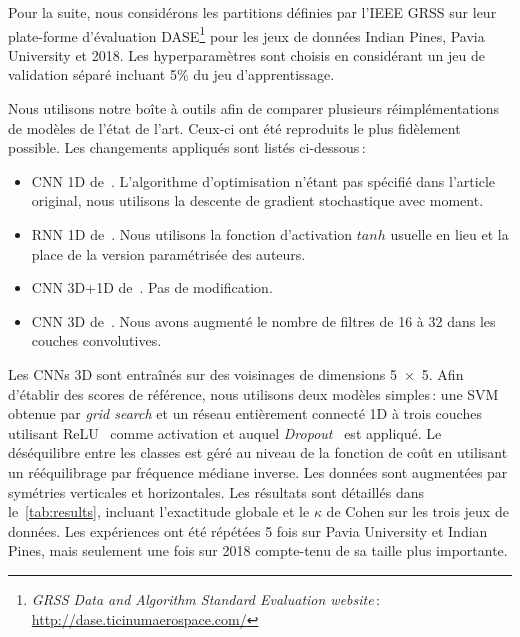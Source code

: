 Pour la suite, nous considérons les partitions définies par l'\gls{IEEE} \gls{GRSS} sur leur plate-forme d'évaluation DASE\footnote{\emph{GRSS Data and Algorithm Standard Evaluation website}\,: \url{http://dase.ticinumaerospace.com/}} pour les jeux de données Indian Pines, Pavia University et  2018. Les hyperparamètres sont choisis en considérant un jeu de validation séparé incluant 5\% du jeu d'apprentissage.

Nous utilisons notre boîte à outils afin de comparer plusieurs réimplémentations de modèles de l'état de l'art. Ceux-ci ont été reproduits le plus fidèlement possible. Les changements appliqués sont listés ci-dessous\,:
\begin{itemize}
	\item \gls{CNN} 1D de~\citet{hu_deep_2015}. L'algorithme d'optimisation n'étant pas spécifié dans l'article original, nous utilisons la descente de gradient stochastique avec moment.
    \item \gls{RNN} 1D de~\citet{mou_deep_2017}. Nous utilisons la fonction d'activation $tanh$ usuelle en lieu et la place de la version paramétrisée des auteurs.
    \item \gls{CNN} 3D+1D de~\citet{ben_hamida_deep_2016}. Pas de modification.
    \item \gls{CNN} 3D de~\citet{li_spectralspatial_2017}. Nous avons augmenté le nombre de filtres de 16 à 32 dans les couches convolutives.
\end{itemize}

Les \glspl{CNN} 3D sont entraînés sur des voisinages de dimensions \num{5x5}. Afin d'établir des scores de référence, nous utilisons deux modèles simples\,: une \gls{SVM} obtenue par \emph{grid search} et un réseau entièrement connecté 1D à trois couches utilisant \gls{ReLU}~\cite{nair_rectified_2010} comme activation et auquel \emph{Dropout}~\cite{srivastava_dropout_2014} est appliqué. Le déséquilibre entre les classes est géré au niveau de la fonction de coût en utilisant un rééquilibrage par fréquence médiane inverse. Les données sont augmentées par symétries verticales et horizontales. Les résultats sont détaillés dans le~\cref{tab:results}, incluant l'exactitude globale et le $\kappa$ de Cohen sur les trois jeux de données. Les expériences ont été répétées 5 fois sur Pavia University et Indian Pines, mais seulement une fois sur  2018 compte-tenu de sa taille plus importante.


